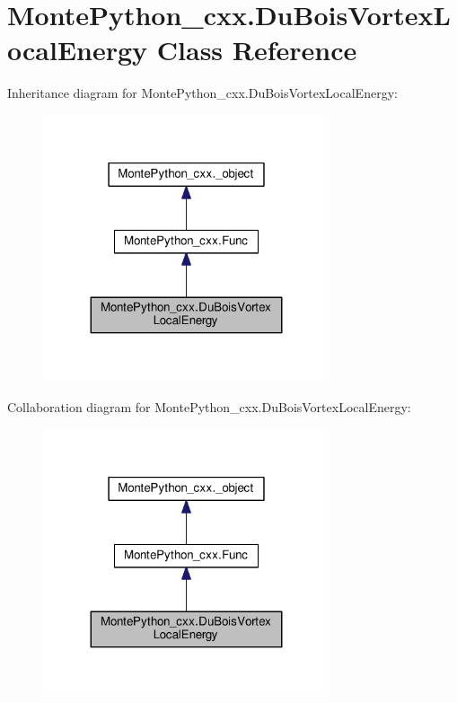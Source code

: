 \hypertarget{classMontePython__cxx_1_1DuBoisVortexLocalEnergy}{}\section{Monte\+Python\+\_\+cxx.\+Du\+Bois\+Vortex\+Local\+Energy Class Reference}
\label{classMontePython__cxx_1_1DuBoisVortexLocalEnergy}


Inheritance diagram for Monte\+Python\+\_\+cxx.\+Du\+Bois\+Vortex\+Local\+Energy\+:
\nopagebreak
\begin{figure}[H]
\begin{center}
\leavevmode
\includegraphics[width=239pt]{classMontePython__cxx_1_1DuBoisVortexLocalEnergy__inherit__graph}
\end{center}
\end{figure}


Collaboration diagram for Monte\+Python\+\_\+cxx.\+Du\+Bois\+Vortex\+Local\+Energy\+:
\nopagebreak
\begin{figure}[H]
\begin{center}
\leavevmode
\includegraphics[width=239pt]{classMontePython__cxx_1_1DuBoisVortexLocalEnergy__coll__graph}
\end{center}
\end{figure}
